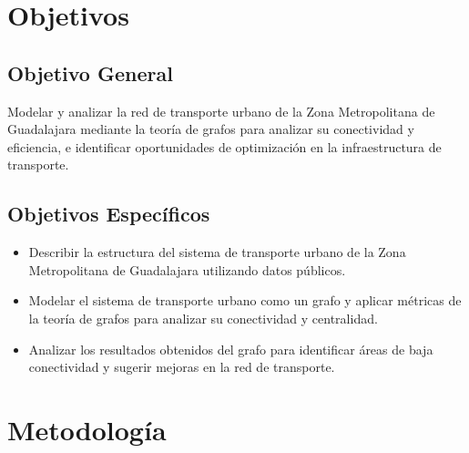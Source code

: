 \documentclass[12pt,oneside]{article}
\begin{document}
\section{Objetivos}

\subsection{Objetivo General}

Modelar y analizar la red de transporte urbano de la Zona Metropolitana de Guadalajara mediante la teoría de grafos para analizar su conectividad y eficiencia, e identificar oportunidades de optimización en la infraestructura de transporte.

\subsection{Objetivos Específicos}

\begin{itemize}
\item Describir la estructura del sistema de transporte urbano de la Zona Metropolitana de Guadalajara utilizando datos públicos.

\item Modelar el sistema de transporte urbano como un grafo y aplicar métricas de la teoría de grafos para analizar su conectividad y centralidad.

\item Analizar los resultados obtenidos del grafo para identificar áreas de baja conectividad y sugerir mejoras en la red de transporte.
\end{itemize}

\section{Metodología}
\end{document}
